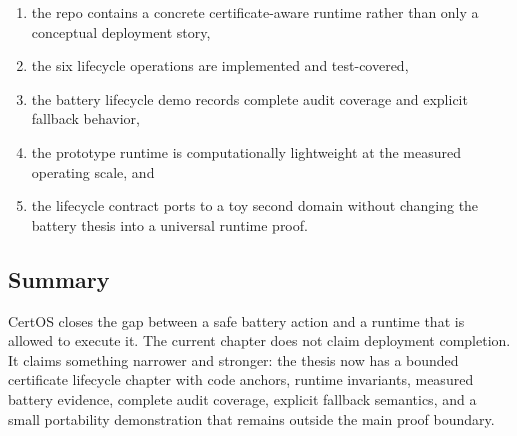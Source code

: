 \begin{enumerate}
  \item the repo contains a concrete certificate-aware runtime rather than
    only a conceptual deployment story,
  \item the six lifecycle operations are implemented and test-covered,
  \item the battery lifecycle demo records complete audit coverage and
    explicit fallback behavior,
  \item the prototype runtime is computationally lightweight at the measured
    operating scale, and
  \item the lifecycle contract ports to a toy second domain without changing
    the battery thesis into a universal runtime proof.
\end{enumerate}

\subsection{Summary}

CertOS closes the gap between a safe battery action and a runtime that is
allowed to execute it.  The current chapter does not claim deployment
completion.  It claims something narrower and stronger: the thesis now has a
bounded certificate lifecycle chapter with code anchors, runtime invariants,
measured battery evidence, complete audit coverage, explicit fallback
semantics, and a small portability demonstration that remains outside the
main proof boundary.
